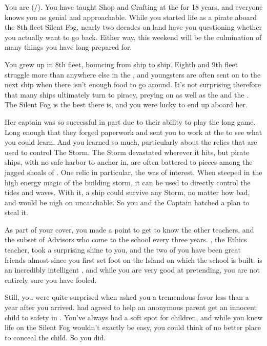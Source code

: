 \documentclass[char]{GL2020}
\begin{document}
\name{\cPirate{}}


You are \cPirate{\full} (\cPirate{\they}/\cPirate{\them}). You have taught Shop and Crafting at the \pSchool{} for 18 years, and everyone knows you as genial and approachable. While you started life as a pirate aboard the 8th fleet Silent Fog, nearly two decades on land have you questioning whether you actually want to go back. Either way, this weekend will be the culmination of many things you have long prepared for.

You grew up in 8th fleet, bouncing from ship to ship. Eighth and 9th fleet struggle more than anywhere else in the \pShip{}, and youngsters are often sent on to the next ship when there isn’t enough food to go around. It’s not surprising therefore that many ships ultimately turn to piracy, preying on \pShippies{} as well as the \pFarm{} and the \pTech{}. The Silent Fog is the best there is, and you were lucky to end up aboard her.

Her captain was so successful in part due to their ability to play the long game. Long enough that they forged paperwork and sent you to work at the \pSchool{} to see what you could learn. And you learned so much, particularly about the relics that are used to control The Storm. The Storm devastated wherever it hits, but pirate ships, with no safe harbor to anchor in, are often battered to pieces among the jagged shoals of \pWod{}. One relic in particular, the \iNet{} was of interest. When steeped in the high energy magic of the building storm, it can be used to directly control the tides and waves. With it, a ship could survive any Storm, no matter how bad, and would be nigh on uncatchable. So you and the Captain hatched a plan to steal it.

As part of your cover, you made a point to get to know the other teachers, and the subset of Advisors who come to the school every three years. \cEthics{}, the Ethics teacher, took a surprising shine to you, and the two of you have been great friends almost since you first set foot on the Island on which the school is built. \cEthics{} is an incredibly intelligent \cEthics{\person}, and while you are very good at pretending, you are not entirely sure you have \cEthics{} fooled.

Still, you were quite surprised when \cEthics{\they} asked you a tremendous favor less than a year after you arrived. \cEthics{} had agreed to help an anonymous parent get an innocent child to safety in \pShip{}. You’ve always had a soft spot for children, and while you knew life on the Silent Fog wouldn’t exactly be easy, you could think of no better place to conceal the child. So you did.
\end{document}
